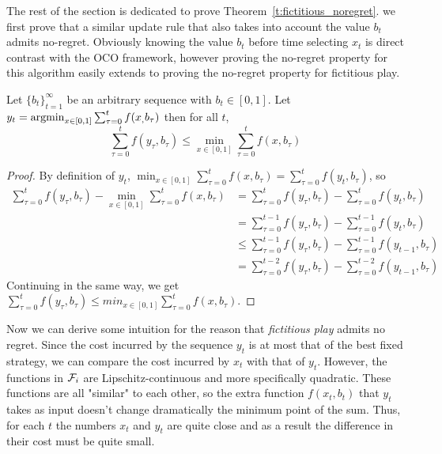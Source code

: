 
The rest of the section is dedicated to prove Theorem~\ref{t:fictitious_noregret}. we first prove that a similar update rule that also takes into
account the value $b_t$ admits no-regret. Obviously knowing the value $b_t$ before time selecting $x_t$ is direct contrast
with the OCO framework, however proving the no-regret property for this algorithm easily extends to proving the no-regret property 
for fictitious play. 

\begin{lemma}
Let $\{b_t\}_{t=1}^\infty$ be an arbitrary sequence with $b_t \in [0,1]$. Let $y_t = \operatorname*{argmin}_{x \in [0,1]}\sum_{\tau=0}^tf(x_,b_\tau)$
then for all $t$,
\[
\sum_{\tau=0}^t f(y_\tau,b_\tau) \leq \min_{x \in [0,1]}\sum_{\tau = 0}^tf(x,b_\tau)
\] 
\end{lemma}

\begin{proof}By definition of $y_t$,
  $\min_{ x \in [0,1]} \sum_{\tau=0}^t f(x,b_\tau) = \sum_{\tau=0}^t f(y_t,b_\tau)$, so
  \begin{align*}
    \sum_{\tau=0}^t f(y_\tau,b_\tau) - \min_{ x \in [0,1]} \sum_{\tau=0}^t f(x,b_\tau) &=
    \sum_{\tau=0}^t f(y_\tau,b_\tau) - \sum_{\tau=0}^t f(y_t,b_\tau)\\
    &= \sum_{\tau=0}^{t-1} f(y_\tau,b_\tau) - \sum_{\tau=0}^{t-1} f(y_t,b_\tau)\\
    &\leq \sum_{\tau=0}^{t-1} f(y_\tau,b_\tau) - \sum_{\tau=0}^{t-1} f(y_{t-1},b_\tau)\\
    &= \sum_{\tau=0}^{t-2} f(y_\tau,b_\tau) - \sum_{\tau=0}^{t-2}f(y_{t-1},b_\tau) 
  \end{align*}
  Continuing in the same way, we get
  $\sum_{\tau=0}^t f(y_\tau,b_\tau) \leq min_{ x \in [0,1]} \sum_{\tau=0}^t f(x,b_\tau)$.
\end{proof}

Now we can derive some intuition for the reason that \emph{fictitious play}
admits no regret. Since the cost incurred by the sequence $y_t$ is at most that
of the best fixed strategy, we can compare the cost incurred by $x_t$ with
that of $y_t$.  However, the functions in $\mathcal{F}_i$ are Lipschitz-continuous and more
specifically quadratic.
These functions are all "similar" to each other, so the extra function $f(x_t,b_t)$ that $y_t$ takes
as input doesn't change dramatically the minimum point of the sum.
Thus, for each $t$ the numbers $x_t$ and $y_t$ are quite
close and as a result the difference in their cost must be quite small.


